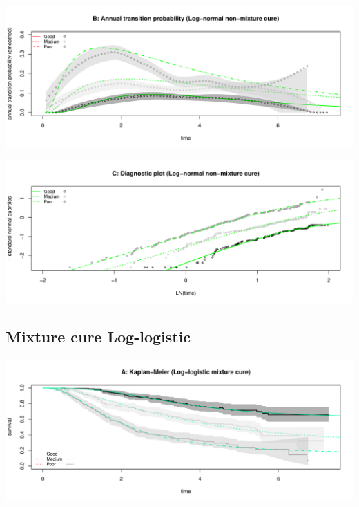 \documentclass[]{article}
\begin{document}
\begin{flushleft}\includegraphics[height=0.25\textheight]{Images/cure_lnorm_nmix-2} \end{flushleft}

\begin{flushleft}\includegraphics[height=0.25\textheight]{Images/cure_lnorm_nmix-3} \end{flushleft}

\newpage

\subsection{Mixture cure Log-logistic}\label{mixture-cure-log-logistic}

\begin{flushleft}\includegraphics[height=0.25\textheight]{Images/cure_llog_mix-1} \end{flushleft}
\end{document}
